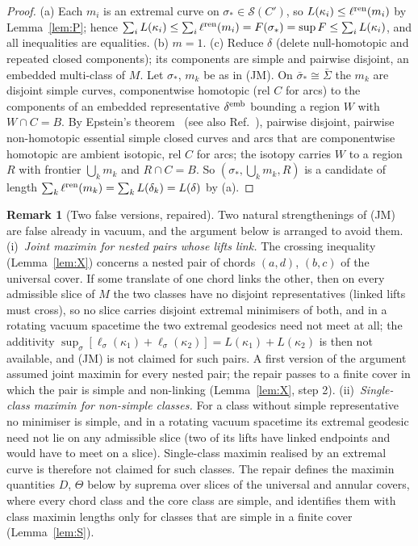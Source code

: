 \documentclass[aps,prd,onecolumn,superscriptaddress,nofootinbib,amsmath,amssymb,11pt]{revtex4-2}
\theoremstyle{definition}
\newtheorem{remark}[theorem]{Remark}
\begin{document}
\begin{proof}
(a) Each $m_i$ is an extremal curve on $\sigma_*\in\mathcal S(C')$, so $L(\kappa_i)\le\ell^{\rm ren}(m_i)$ by Lemma~\ref{lem:P}; hence
$\sum_iL(\kappa_i)\le\sum_i\ell^{\rm ren}(m_i)=F(\sigma_*)=\sup F\le\sum_iL(\kappa_i)$, and all inequalities are equalities.
(b) $m=1$. (c) Reduce $\delta$ (delete null-homotopic and repeated closed components); its components are simple and
pairwise disjoint, an embedded multi-class of $M$. Let $\sigma_*$, $m_k$ be as in (JM). On $\bar\sigma_*\cong\bar\Sigma$ the
$m_k$ are disjoint simple curves, componentwise homotopic (rel $C$ for arcs) to the components of an embedded
representative $\delta^{\rm emb}$ bounding a region $W$ with $W\cap C=B$. By Epstein's theorem~\cite{Epstein1966} (see
also Ref.~\cite{FarbMargalit2012}), pairwise disjoint, pairwise non-homotopic essential simple closed curves and arcs
that are componentwise homotopic are ambient isotopic, rel $C$ for arcs; the isotopy carries $W$ to a region $R$ with
frontier $\bigcup_km_k$ and $R\cap C=B$. So $(\sigma_*,\bigcup_km_k,R)$ is a candidate of length
$\sum_k\ell^{\rm ren}(m_k)=\sum_kL(\delta_k)=L(\delta)$ by (a).
\end{proof}

\begin{remark}[Two false versions, repaired]\label{rem:false}
Two natural strengthenings of (JM) are false already in vacuum, and the argument below is arranged to avoid them.
(i)~\emph{Joint maximin for nested pairs whose lifts link.} The crossing inequality (Lemma~\ref{lem:X}) concerns a
nested pair of chords $(a,d)$, $(b,c)$ of the universal cover. If some translate of one chord links the other, then on
every admissible slice of $M$ the two classes have no disjoint representatives (linked lifts must cross), so no slice
carries disjoint extremal minimisers of both, and in a rotating vacuum spacetime the two extremal geodesics need not meet
at all; the additivity $\sup_\sigma[\ell_\sigma(\kappa_1)+\ell_\sigma(\kappa_2)]=L(\kappa_1)+L(\kappa_2)$ is then not available, and
(JM) is not claimed for such pairs. A first version of the argument assumed joint maximin for every nested pair; the
repair passes to a finite cover in which the pair is simple and non-linking (Lemma~\ref{lem:X}, step 2).
(ii)~\emph{Single-class maximin for non-simple classes.} For a class without simple representative no minimiser is simple,
and in a rotating vacuum spacetime its extremal geodesic need not lie on any admissible slice (two of its lifts have
linked endpoints and would have to meet on a slice). Single-class maximin realised by an extremal curve is therefore not
claimed for such classes. The repair defines the maximin quantities $D$, $\Theta$ below by suprema over slices of the
universal and annular covers, where every chord class and the core class are simple, and identifies them with class
maximin lengths only for classes that are simple in a finite cover (Lemma~\ref{lem:S}).
\end{remark}
\end{document}
